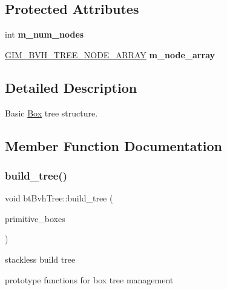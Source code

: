 \subsection*{Protected Attributes}
\begin{DoxyCompactItemize}
\item 
\mbox{\label{classbtBvhTree_a2d08e4099671e71c48786c26f7cd554a}} 
int {\bfseries m\+\_\+num\+\_\+nodes}
\item 
\mbox{\label{classbtBvhTree_a0b90eb3e890f84648f7c3b7ca52fefb7}} 
\hyperlink{classGIM__BVH__TREE__NODE__ARRAY}{G\+I\+M\+\_\+\+B\+V\+H\+\_\+\+T\+R\+E\+E\+\_\+\+N\+O\+D\+E\+\_\+\+A\+R\+R\+AY} {\bfseries m\+\_\+node\+\_\+array}
\end{DoxyCompactItemize}


\subsection{Detailed Description}
Basic \hyperlink{classBox}{Box} tree structure. 

\subsection{Member Function Documentation}
\mbox{\label{classbtBvhTree_aed589b2985838c6268597f4f64a96c46}} 
\subsubsection{\texorpdfstring{build\+\_\+tree()}{build\_tree()}\hspace{0.1cm}{\footnotesize\ttfamily [1/2]}}
{\footnotesize\ttfamily void bt\+Bvh\+Tree\+::build\+\_\+tree (\begin{DoxyParamCaption}\item[{\hyperlink{classGIM__BVH__DATA__ARRAY}{G\+I\+M\+\_\+\+B\+V\+H\+\_\+\+D\+A\+T\+A\+\_\+\+A\+R\+R\+AY} \&}]{primitive\+\_\+boxes }\end{DoxyParamCaption})}



stackless build tree 

prototype functions for box tree management \mbox{\label{classbtBvhTree_aed589b2985838c6268597f4f64a96c46}} 
